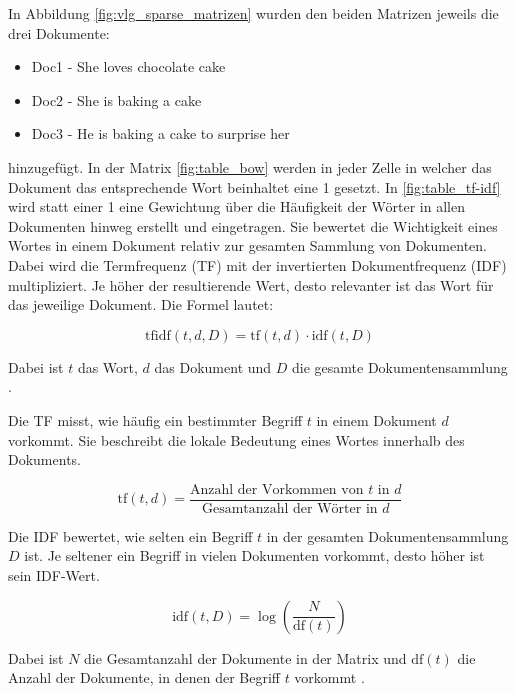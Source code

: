 In Abbildung \ref{fig:vlg_sparse_matrizen} wurden den beiden Matrizen jeweils die drei Dokumente:

\begin{itemize}
    \item Doc1 - She loves chocolate cake
    \item Doc2 - She is baking a cake
    \item Doc3 - He is baking a cake to surprise her
\end{itemize}

hinzugefügt. In der Matrix \ref{fig:table_bow} werden in jeder Zelle in welcher das Dokument das entsprechende Wort beinhaltet eine 1 gesetzt.
In \ref{fig:table_tf-idf} wird statt einer 1 eine Gewichtung über die Häufigkeit der Wörter in allen Dokumenten hinweg erstellt und eingetragen.
Sie bewertet die Wichtigkeit eines Wortes in einem Dokument relativ zur gesamten Sammlung von Dokumenten. Dabei wird die Termfrequenz (TF) mit der 
invertierten Dokumentfrequenz (IDF) multipliziert. Je höher der resultierende Wert, desto relevanter ist das Wort für das jeweilige Dokument. 
Die Formel lautet:

\begin{equation}
    \text{tfidf}(t, d, D) = \text{tf}(t, d) \cdot \text{idf}(t, D)
\end{equation}

Dabei ist \( t \) das Wort, \( d \) das Dokument und \( D \) die gesamte Dokumentensammlung \cite{aslam2022}.

Die TF misst, wie häufig ein bestimmter Begriff \( t \) in einem Dokument \( d \) vorkommt. 
Sie beschreibt die lokale Bedeutung eines Wortes innerhalb des Dokuments.

\begin{equation}
\text{tf}(t, d) = \frac{\text{Anzahl der Vorkommen von } t \text{ in } d}{\text{Gesamtanzahl der Wörter in } d}
\end{equation}

Die IDF bewertet, wie selten ein Begriff \( t \) in der gesamten Dokumentensammlung \( D \) ist. 
Je seltener ein Begriff in vielen Dokumenten vorkommt, desto höher ist sein IDF-Wert.

\begin{equation}
    \text{idf}(t, D) = \log \left( \frac{N}{\text{df}(t)} \right)
\end{equation}

Dabei ist \( N \) die Gesamtanzahl der Dokumente in der Matrix und \( \text{df}(t) \) die Anzahl der Dokumente, 
in denen der Begriff \( t \) vorkommt \cite{qaiser2018}.

